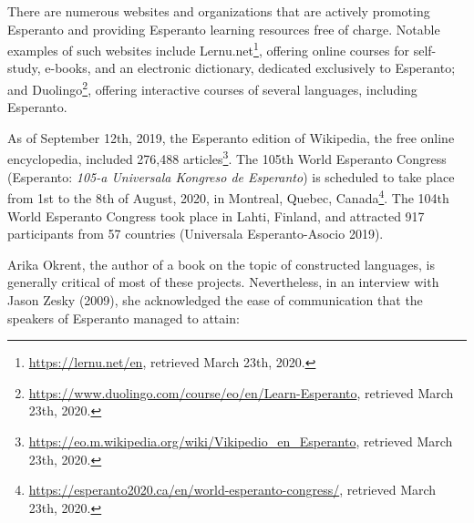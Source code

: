 There are numerous websites and organizations that are actively promoting Esperanto and providing Esperanto learning resources free of charge.
Notable examples of such websites include Lernu.net\footnote{\url{https://lernu.net/en}, retrieved March 23th, 2020.}, offering online courses for self-study, e-books, and an electronic dictionary, dedicated exclusively to Esperanto; and Duolingo\footnote{\url{https://www.duolingo.com/course/eo/en/Learn-Esperanto}, retrieved March 23th, 2020.}, offering interactive courses of several languages, including Esperanto.

As of September 12th, 2019, the Esperanto edition of Wikipedia, the free online encyclopedia, included 276,488 articles\footnote{\url{https://eo.m.wikipedia.org/wiki/Vikipedio_en_Esperanto}, retrieved March 23th, 2020.}.
The 105th World Esperanto Congress (Esperanto: \textit{105-a Universala Kongreso de Esperanto}) is scheduled to take place from 1st to the 8th of August, 2020, in Montreal, Quebec, Canada\footnote{\url{https://esperanto2020.ca/en/world-esperanto-congress/}, retrieved March 23th, 2020.}.
The 104th World Esperanto Congress took place in Lahti, Finland, and attracted 917 participants from 57 countries (Universala Esperanto-Asocio 2019).

Arika Okrent, the author of a book on the topic of constructed languages, is generally critical of most of these projects.
Nevertheless, in an interview with Jason Zesky (2009), she acknowledged the ease of communication that the speakers of Esperanto managed to attain:


